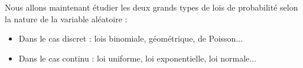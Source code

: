 Nous allons maintenant étudier les deux grands types de lois de probabilité selon la nature de la variable aléatoire : 

\begin{itemize}
    \item Dans le cas discret : lois binomiale, géométrique, de Poisson...
    \item Dans le cas continu : loi uniforme, loi exponentielle, loi normale...
\end{itemize}
